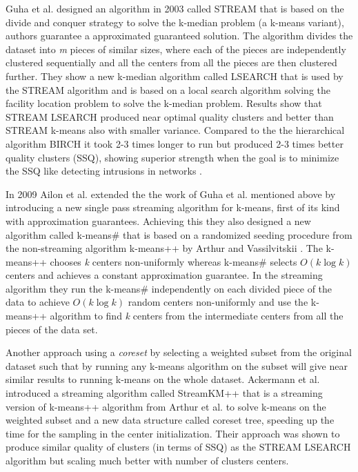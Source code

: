 Guha et al. \citep{Guha:2003} designed an algorithm in 2003 called STREAM that is based on the divide and conquer strategy to solve the k-median problem (a k-means variant), authors guarantee a approximated guaranteed solution. The algorithm divides the dataset into \textit{m} pieces of similar sizes, where each of the pieces are independently clustered sequentially and all the centers from all the pieces are then clustered further. They show a new k-median algorithm called LSEARCH that is used by the STREAM algorithm and is based on a local search algorithm solving the facility location problem \citep{Charikar:1999} to solve the k-median problem. Results show that STREAM LSEARCH produced near optimal quality clusters and better than STREAM k-means also with smaller variance. Compared to the the hierarchical algorithm BIRCH \citep{Zhang:1996} it took 2-3 times longer to run but produced 2-3 times better quality clusters (SSQ), showing superior strength when the goal is to minimize the SSQ like detecting intrusions in networks \citep{Marchette:1999NI}. 

In 2009 Ailon et al. \citep{Ailon:2009} extended the the work of Guha et al. mentioned above by introducing a new single pass streaming algorithm for k-means, first of its kind with approximation guarantees. Achieving this they also designed a new algorithm called k-means\# that is based on a randomized seeding procedure from the non-streaming algorithm k-means++ by Arthur and Vassilvitskii \citep{Arthur:2007}. The k-means++ chooses \textit{k} centers non-uniformly whereas k-means\# selects $O(k\log{k})$ centers and achieves a constant approximation guarantee. In the streaming algorithm they run the k-means\# independently on each divided piece of the data to achieve $O(k \log{k})$ random centers non-uniformly and use the k-means++ algorithm to find \textit{k} centers from the intermediate centers from all the pieces of the data set. 

Another approach using a \textit{coreset} by selecting a weighted subset from the original dataset such that by running any k-means algorithm on the subset will give near similar results to running k-means on the whole dataset. Ackermann et al. \citep{Ackermann:2010} introduced a streaming algorithm called StreamKM++ that is a streaming version of k-means++ algorithm from Arthur et al. \citep{Arthur:2007} to solve k-means on the weighted subset and a new data structure called coreset tree, speeding up the time for the sampling in the center initialization. Their approach was shown to produce similar quality of clusters (in terms of SSQ) as the STREAM LSEARCH \citep{Guha:2003} algorithm but scaling much better with number of clusters centers. 

